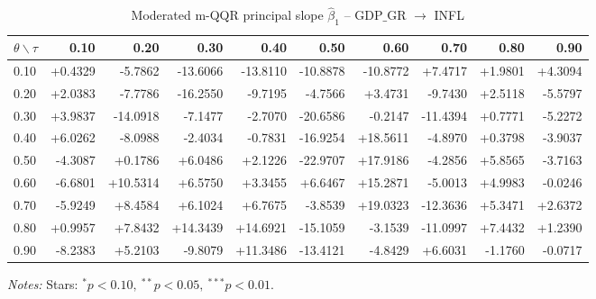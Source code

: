 \begin{table}[!htbp]
  \centering
  \caption{Moderated m-QQR principal slope $\hat{\beta}_1$ -- GDP$\_$GR $\to$ INFL}
  \label{tab:mqqr_beta1}
  \begin{tabular}{lrrrrrrrrr}
    \toprule
    $\theta \backslash \tau$ & 0.10 & 0.20 & 0.30 & 0.40 & 0.50 & 0.60 & 0.70 & 0.80 & 0.90 \\
    \midrule
    0.10 & +0.4329 & -5.7862 & -13.6066 & -13.8110 & -10.8878 & -10.8772 & +7.4717 & +1.9801 & +4.3094 \\
    0.20 & +2.0383 & -7.7786 & -16.2550 & -9.7195 & -4.7566 & +3.4731 & -9.7430 & +2.5118 & -5.5797 \\
    0.30 & +3.9837 & -14.0918 & -7.1477 & -2.7070 & -20.6586 & -0.2147 & -11.4394 & +0.7771 & -5.2272 \\
    0.40 & +6.0262 & -8.0988 & -2.4034 & -0.7831 & -16.9254 & +18.5611 & -4.8970 & +0.3798 & -3.9037 \\
    0.50 & -4.3087 & +0.1786 & +6.0486 & +2.1226 & -22.9707 & +17.9186 & -4.2856 & +5.8565 & -3.7163 \\
    0.60 & -6.6801 & +10.5314 & +6.5750 & +3.3455 & +6.6467 & +15.2871 & -5.0013 & +4.9983 & -0.0246 \\
    0.70 & -5.9249 & +8.4584 & +6.1024 & +6.7675 & -3.8539 & +19.0323 & -12.3636 & +5.3471 & +2.6372 \\
    0.80 & +0.9957 & +7.8432 & +14.3439 & +14.6921 & -15.1059 & -3.1539 & -11.0997 & +7.4432 & +1.2390 \\
    0.90 & -8.2383 & +5.2103 & -9.8079 & +11.3486 & -13.4121 & -4.8429 & +6.6031 & -1.1760 & -0.0717 \\
    \bottomrule
  \end{tabular}
  \par\medskip\footnotesize\textit{Notes:} Stars: $^*p<0.10,\ ^{**}p<0.05,\ ^{***}p<0.01$.
\end{table}